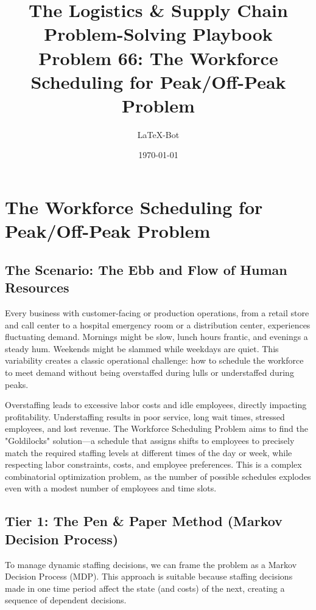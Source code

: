 \documentclass{article}
\begin{document}
\title{The Logistics \& Supply Chain Problem-Solving Playbook\\ \large Problem 66: The Workforce Scheduling for Peak/Off-Peak Problem}
\author{LaTeX-Bot}
\date{\today}
\maketitle
\tableofcontents
\newpage

\section{The Workforce Scheduling for Peak/Off-Peak Problem}

\subsection{The Scenario: The Ebb and Flow of Human Resources}
Every business with customer-facing or production operations, from a retail store and call center to a hospital emergency room or a distribution center, experiences fluctuating demand. Mornings might be slow, lunch hours frantic, and evenings a steady hum. Weekends might be slammed while weekdays are quiet. This variability creates a classic operational challenge: how to schedule the workforce to meet demand without being overstaffed during lulls or understaffed during peaks.

Overstaffing leads to excessive labor costs and idle employees, directly impacting profitability. Understaffing results in poor service, long wait times, stressed employees, and lost revenue. The Workforce Scheduling Problem aims to find the "Goldilocks" solution---a schedule that assigns shifts to employees to precisely match the required staffing levels at different times of the day or week, while respecting labor constraints, costs, and employee preferences. This is a complex combinatorial optimization problem, as the number of possible schedules explodes even with a modest number of employees and time slots.

\subsection{Tier 1: The Pen \& Paper Method (Markov Decision Process)}
To manage dynamic staffing decisions, we can frame the problem as a Markov Decision Process (MDP). This approach is suitable because staffing decisions made in one time period affect the state (and costs) of the next, creating a sequence of dependent decisions.
\end{document}
